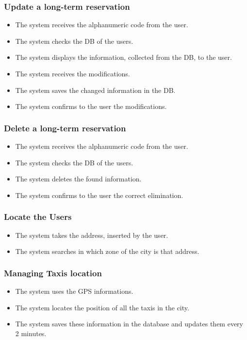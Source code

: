 		\subsubsection{Update a long-term reservation}
		\begin{itemize}
			\item The system receives the alphanumeric code from the user.
			\item The system checks the DB of the users.
			\item The system displays the information, collected from the DB, to the user.
			\item The system receives the modifications.
			\item The system saves the changed information in the DB.
			\item The system confirms to the user the modifications.
		\end{itemize}
		\subsubsection{Delete a long-term reservation}
		\begin{itemize}
			\item The system receives the alphanumeric code from the user.
			\item The system checks the DB of the users.
			\item The system deletes the found information.
			\item The system confirms to the user the correct elimination.
		\end{itemize}
		\subsubsection{Locate the Users}
		\begin{itemize}
			\item The system takes the address, inserted by the user.
			\item The system searches in which zone of the city is that address.
		\end{itemize}		
		\subsubsection{Managing Taxis location}
		\begin{itemize}
			\item The system uses the GPS informations.
			\item The system locates the position of all the taxis in the city.
			\item The system saves these information in the database and updates them every 2 minutes.
		\end{itemize}
